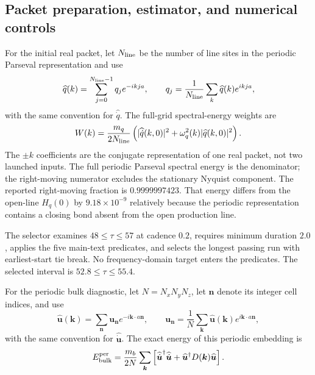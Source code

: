 \documentclass[10pt,aps,pre,onecolumn,notitlepage,nofootinbib]{revtex4-2}
\newcommand{\vk}{\bm k}
\begin{document}
\subsection{Packet preparation, estimator, and numerical controls}

For the initial real packet, let $N_{\rm line}$ be the number of line sites in the periodic Parseval representation and use
\begin{equation}
 \widehat q(k)=\sum_{j=0}^{N_{\rm line}-1}q_j e^{-ikja},
 \qquad
 q_j=\frac{1}{N_{\rm line}}\sum_k\widehat q(k)e^{ikja},
\end{equation}
with the same convention for $\widehat{\dot q}$. The full-grid spectral-energy weights are
\begin{equation}
 W(k)=\frac{m_q}{2N_{\rm line}}\left(|\widehat{\dot q}(k,0)|^2+\omega_q^2(k)|\widehat q(k,0)|^2\right).
\end{equation}
The $\pm k$ coefficients are the conjugate representation of one real packet, not two launched inputs. The full periodic Parseval spectral energy is the denominator; the right-moving numerator excludes the stationary Nyquist component. The reported right-moving fraction is $0.9999997423$. That energy differs from the open-line $H_q(0)$ by $9.18\times10^{-9}$ relatively because the periodic representation contains a closing bond absent from the open production line.

The selector examines $48\le\tau\le57$ at cadence $0.2$, requires minimum duration $2.0$, applies the five main-text predicates, and selects the longest passing run with earliest-start tie break. No frequency-domain target enters the predicates. The selected interval is $52.8\le\tau\le55.4$.

For the periodic bulk diagnostic, let $N=N_xN_yN_z$, let $\bm n$ denote its integer cell indices, and use
\begin{equation}
 \widehat{\bm u}(\vk)=\sum_{\bm n}\bm u_{\bm n}e^{-i\vk\cdot a\bm n},
 \qquad
 \bm u_{\bm n}=\frac{1}{N}\sum_{\vk}\widehat{\bm u}(\vk)e^{i\vk\cdot a\bm n},
\end{equation}
with the same convention for $\widehat{\dot{\bm u}}$. The exact energy of this periodic embedding is
\begin{equation}
 E_{\rm bulk}^{\rm per}
 =\frac{m_b}{2N}\sum_{\vk}
 \left[
  \widehat{\dot{\bm u}}^{\dagger}\widehat{\dot{\bm u}}
  +\widehat{\bm u}^{\dagger}D(\vk)\widehat{\bm u}
 \right].
\end{equation}
\end{document}

